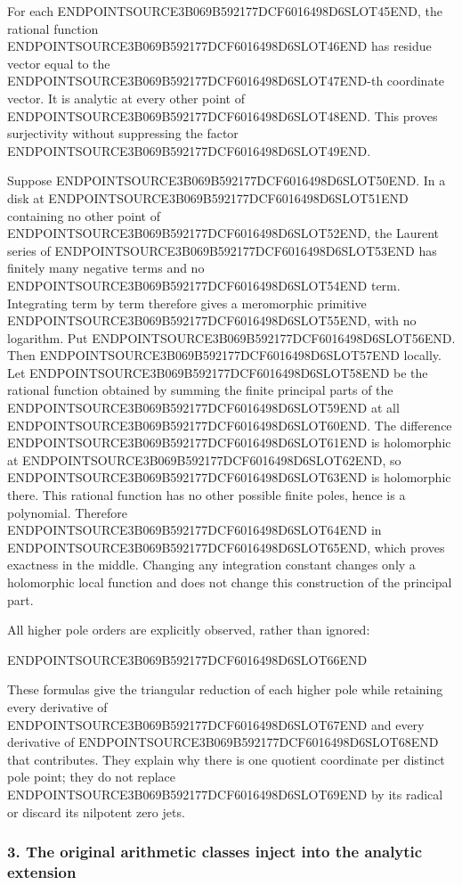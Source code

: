 For each ENDPOINTSOURCE3B069B592177DCF6016498D6SLOT45END, the rational function ENDPOINTSOURCE3B069B592177DCF6016498D6SLOT46END has residue vector equal to the ENDPOINTSOURCE3B069B592177DCF6016498D6SLOT47END-th coordinate vector. It is analytic at every other point of ENDPOINTSOURCE3B069B592177DCF6016498D6SLOT48END. This proves surjectivity without suppressing the factor ENDPOINTSOURCE3B069B592177DCF6016498D6SLOT49END.

Suppose ENDPOINTSOURCE3B069B592177DCF6016498D6SLOT50END. In a disk at ENDPOINTSOURCE3B069B592177DCF6016498D6SLOT51END containing no other point of ENDPOINTSOURCE3B069B592177DCF6016498D6SLOT52END, the Laurent series of ENDPOINTSOURCE3B069B592177DCF6016498D6SLOT53END has finitely many negative terms and no ENDPOINTSOURCE3B069B592177DCF6016498D6SLOT54END term. Integrating term by term therefore gives a meromorphic primitive ENDPOINTSOURCE3B069B592177DCF6016498D6SLOT55END, with no logarithm. Put ENDPOINTSOURCE3B069B592177DCF6016498D6SLOT56END. Then ENDPOINTSOURCE3B069B592177DCF6016498D6SLOT57END locally. Let ENDPOINTSOURCE3B069B592177DCF6016498D6SLOT58END be the rational function obtained by summing the finite principal parts of the ENDPOINTSOURCE3B069B592177DCF6016498D6SLOT59END at all ENDPOINTSOURCE3B069B592177DCF6016498D6SLOT60END. The difference ENDPOINTSOURCE3B069B592177DCF6016498D6SLOT61END is holomorphic at ENDPOINTSOURCE3B069B592177DCF6016498D6SLOT62END, so ENDPOINTSOURCE3B069B592177DCF6016498D6SLOT63END is holomorphic there. This rational function has no other possible finite poles, hence is a polynomial. Therefore ENDPOINTSOURCE3B069B592177DCF6016498D6SLOT64END in ENDPOINTSOURCE3B069B592177DCF6016498D6SLOT65END, which proves exactness in the middle. Changing any integration constant changes only a holomorphic local function and does not change this construction of the principal part.

All higher pole orders are explicitly observed, rather than ignored:

ENDPOINTSOURCE3B069B592177DCF6016498D6SLOT66END

These formulas give the triangular reduction of each higher pole while retaining every derivative of ENDPOINTSOURCE3B069B592177DCF6016498D6SLOT67END and every derivative of ENDPOINTSOURCE3B069B592177DCF6016498D6SLOT68END that contributes. They explain why there is one quotient coordinate per distinct pole point; they do not replace ENDPOINTSOURCE3B069B592177DCF6016498D6SLOT69END by its radical or discard its nilpotent zero jets.

\subsubsection{3. The original arithmetic classes inject into the analytic extension}\label{endpoint-analytic_pole--the-original-arithmetic-classes-inject-into-the-analytic-extension}

